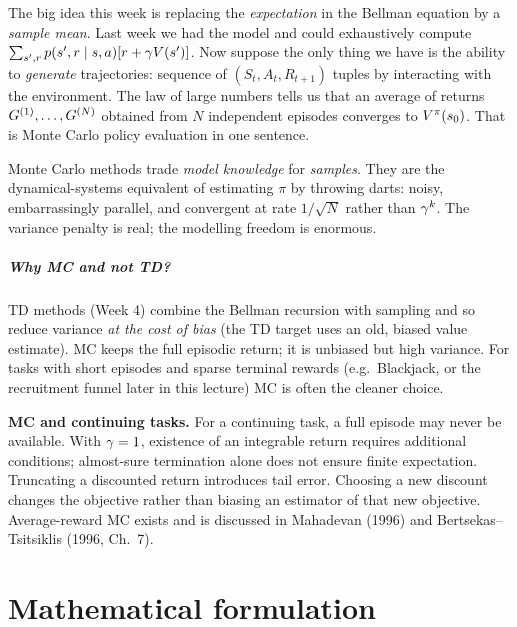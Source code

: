 \documentclass[11pt,oneside]{scrbook}
\begin{document}
The big idea this week is replacing the \emph{expectation} in the Bellman
equation by a \emph{sample mean}. Last week we had the model and could
exhaustively compute $\sum_{s',r} p(s',r\mid s,a)[r + \gamma V(s')]$. Now
suppose the only thing we have is the ability to \emph{generate} trajectories:
sequence of $(S_t, A_t, R_{t+1})$ tuples by interacting with the environment.
The law of large numbers tells us that an average of returns
$G^{(1)},\dots,G^{(N)}$ obtained from $N$ independent episodes converges
to $V^\pi(s_0)$. That is Monte Carlo policy evaluation in one sentence.

\begin{intuition}
Monte Carlo methods trade \emph{model knowledge} for \emph{samples}. They are
the dynamical-systems equivalent of estimating $\pi$ by throwing darts: noisy,
embarrassingly parallel, and convergent at rate $1/\sqrt{N}$ rather than
$\gamma^k$. The variance penalty is real; the modelling freedom is enormous.
\end{intuition}

\paragraph{Why MC and not TD?} TD methods (Week 4) combine the Bellman
recursion with sampling and so reduce variance \emph{at the cost of bias} (the
TD target uses an old, biased value estimate). MC keeps the full episodic
return; it is unbiased but high variance. For tasks with short episodes and
sparse terminal rewards (e.g.\ Blackjack, or the recruitment funnel later in
this lecture) MC is often the cleaner choice.

\begin{pitfall}
\textbf{MC and continuing tasks.} For a continuing task, a full episode may never be available. With
$\gamma=1$, existence of an integrable return requires additional conditions;
almost-sure termination alone does not ensure finite expectation. Truncating
a discounted return introduces tail error. Choosing a new discount changes
the objective rather than biasing an estimator of that new objective. Average-reward MC exists and is
discussed in Mahadevan (1996) and Bertsekas--Tsitsiklis (1996, Ch.\ 7).
\end{pitfall}

\chapter{Mathematical formulation}
\end{document}
